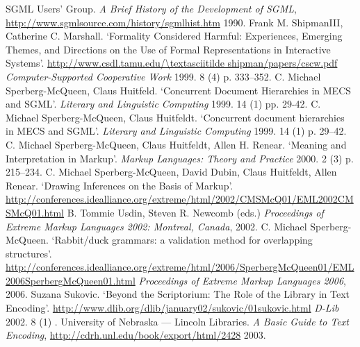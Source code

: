 \begin{bibitemlist}{1}
\label{SGMLUsersGroup1990}SGML Users' Group. \textit{A Brief History of the Development of SGML},  \url{http://www.sgmlsource.com/history/sgmlhist.htm} 1990. 
\label{ShipmanandMarshall1999}Frank M. ShipmanIII, Catherine C. Marshall. ‘Formality Considered Harmful: Experiences, Emerging Themes, and Directions on the Use of Formal Representations in Interactive Systems’.   \url{http://www.csdl.tamu.edu/\textasciitilde shipman/papers/cscw.pdf} \textit{Computer-Supported Cooperative Work} 1999. 8  (4)  p. 333–352. 
\label{XX-1}C. Michael Sperberg-McQueen, Claus Huitfeld. ‘Concurrent Document Hierarchies in MECS and SGML’. \textit{Literary and Linguistic Computing} 1999. 14  (1)  pp. 29-42. 
\label{SperbergMcQueenandHuitfeldt1999}C. Michael Sperberg-McQueen, Claus Huitfeldt. ‘Concurrent document hierarchies in MECS and SGML’.  \textit{Literary and Linguistic Computing} 1999. 14  (1)  p. 29–42. 
\label{SperbergMcQueenetal2000}C. Michael Sperberg-McQueen, Claus Huitfeldt, Allen H. Renear. ‘Meaning and Interpretation in Markup’. \textit{Markup Languages: Theory and Practice} 2000. 2  (3)  p. 215–234. 
\label{SperbergMcQueenetal2002}C. Michael Sperberg-McQueen, David Dubin, Claus Huitfeldt, Allen Renear. ‘Drawing Inferences on the Basis of Markup’.  \url{http://conferences.idealliance.org/extreme/html/2002/CMSMcQ01/EML2002CMSMcQ01.html} B. Tommie Usdin, Steven R. Newcomb (eds.) \textit{Proceedings of Extreme Markup Languages 2002: Montreal, Canada}, 2002. 
\label{XX-2}C. Michael Sperberg-McQueen. ‘Rabbit/duck grammars: a validation method for overlapping structures’.  \url{http://conferences.idealliance.org/extreme/html/2006/SperbergMcQueen01/EML2006SperbergMcQueen01.html} \textit{Proceedings of Extreme Markup Languages 2006}, 2006. 
\label{Sukovic2002}Suzana Sukovic. ‘Beyond the Scriptorium: The Role of the Library in Text Encoding’.  \url{http://www.dlib.org/dlib/january02/sukovic/01sukovic.html} \textit{D-Lib} 2002. 8  (1) . 
\label{UniversityofNebraskaLincolnLibraries2003}University of Nebraska — Lincoln Libraries. \textit{A Basic Guide to Text Encoding},  \url{http://cdrh.unl.edu/book/export/html/2428} 2003. 

\end{bibitemlist}
